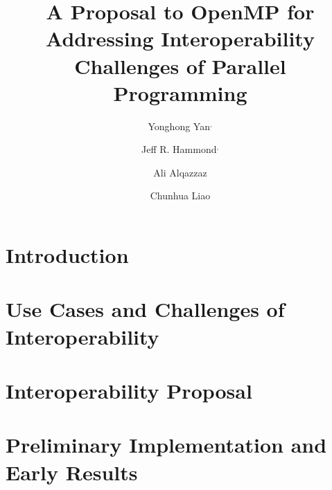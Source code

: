 \documentclass{llncs}
\begin{document}
%
\mainmatter              %
%
\title{A Proposal to OpenMP for Addressing Interoperability Challenges of Parallel Programming} %
%
\author{
	Yonghong Yan$^{,}$ \and
	Jeff R. Hammond$^{,}$ \and
	Ali Alqazzaz \and
	Chunhua Liao
}

\maketitle              %

\begin{abstract}

\end{abstract}
%

\section{Introduction}
\label{sec:intro}


\section{Use Cases and Challenges of Interoperability}
\label{sec:challenges}


\section{Interoperability Proposal}
\label{sec:proposal}


\section{Preliminary Implementation and Early Results}
\label{sec:implementation}

\end{document}
